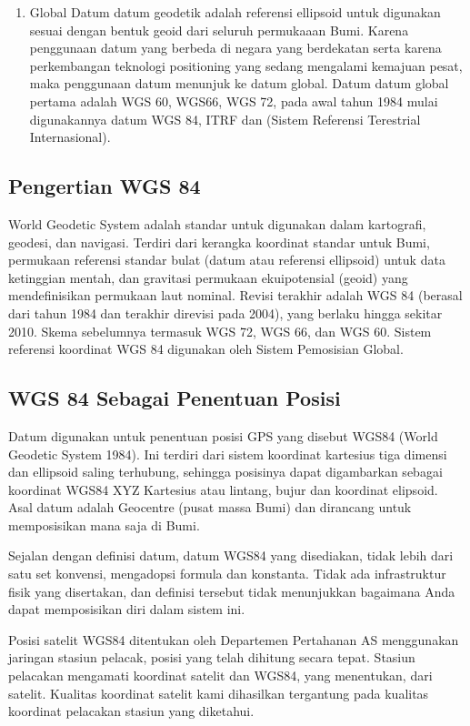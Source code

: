 \begin{enumerate}
\item Global Datum datum geodetik adalah referensi ellipsoid untuk digunakan sesuai dengan bentuk geoid dari seluruh permukaaan Bumi. Karena penggunaan datum yang berbeda di negara yang berdekatan serta karena perkembangan teknologi positioning yang sedang mengalami kemajuan pesat, maka penggunaan datum menunjuk ke datum global. Datum datum global pertama adalah WGS 60, WGS66, WGS 72, pada awal tahun 1984 mulai digunakannya datum WGS 84, ITRF dan (Sistem Referensi Terestrial Internasional).
\end{enumerate}

\subsection{Pengertian WGS 84}
World Geodetic System adalah standar untuk digunakan dalam kartografi, geodesi, dan navigasi. Terdiri dari kerangka koordinat standar untuk Bumi, permukaan referensi standar bulat (datum atau referensi ellipsoid) untuk data ketinggian mentah, dan gravitasi permukaan ekuipotensial (geoid) yang mendefinisikan permukaan laut nominal. 
Revisi terakhir adalah WGS 84 (berasal dari tahun 1984 dan terakhir direvisi pada 2004), yang berlaku hingga sekitar 2010. Skema sebelumnya termasuk WGS 72, WGS 66, dan WGS 60. Sistem referensi koordinat WGS 84 digunakan oleh Sistem Pemosisian Global.

\subsection{WGS 84 Sebagai Penentuan Posisi}
Datum digunakan untuk penentuan posisi GPS yang disebut WGS84 (World Geodetic System 1984). Ini terdiri dari sistem koordinat kartesius tiga dimensi dan ellipsoid saling terhubung, sehingga posisinya dapat digambarkan sebagai koordinat WGS84 XYZ Kartesius atau lintang, bujur dan koordinat elipsoid. Asal datum adalah Geocentre (pusat massa Bumi) dan dirancang untuk memposisikan mana saja di Bumi.
 
Sejalan dengan definisi datum, datum WGS84 yang disediakan, tidak lebih dari satu set konvensi, mengadopsi formula dan konstanta. Tidak ada infrastruktur fisik yang disertakan, dan definisi tersebut tidak menunjukkan bagaimana Anda dapat memposisikan diri dalam sistem ini. 

Posisi satelit WGS84 ditentukan oleh Departemen Pertahanan AS menggunakan jaringan stasiun pelacak, posisi yang telah dihitung secara tepat. Stasiun pelacakan mengamati koordinat satelit dan WGS84, yang menentukan, dari satelit. Kualitas koordinat satelit kami dihasilkan tergantung pada kualitas koordinat pelacakan stasiun yang diketahui. 


